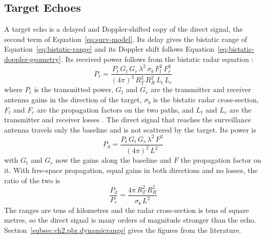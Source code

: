 \subsection{Target Echoes}
\label{subsec:th.signalmodel.targets}
\todo{}
A target echo is a delayed and Doppler-shifted copy of the direct signal, the second term of Equation~\ref{eq:surv-model}. Its delay gives the bistatic range of Equation~\ref{eq:bistatic-range} and its Doppler shift follows Equation~\ref{eq:bistatic-doppler-geometry}. Its received power follows from the bistatic radar equation \citep{kuschel2019}:
\begin{equation}
    P_r = \frac{P_t \, G_t \, G_r \, \lambda^2 \, \sigma_b \, F_t^2 \, F_r^2}
               {(4\pi)^3 \, R_T^2 \, R_R^2 \, L_t \, L_r}
    \label{eq:bistatic-radar}
\end{equation}
where $P_t$ is the transmitted power, $G_t$ and $G_r$ are the transmitter and receiver antenna gains in the direction of the target, $\sigma_b$ is the bistatic radar cross-section, $F_t$ and $F_r$ are the propagation factors on the two paths, and $L_t$ and $L_r$ are the transmitter and receiver losses .
The direct signal that reaches the surveillance antenna travels only the baseline and is not scattered by the target. Its power is \citep{kuschel2019}
\begin{equation}
    P_d = \frac{P_t \, G_t \, G_r \, \lambda^2 \, F^2}{(4\pi)^2 \, L^2}
    \label{eq:direct-power}
\end{equation}
with $G_t$ and $G_r$ now the gains along the baseline and $F$ the propagation factor on it. With free-space propagation, equal gains in both directions and no losses, the ratio of the two is
\begin{equation}
    \frac{P_d}{P_r} = \frac{4\pi \, R_T^2 \, R_R^2}{\sigma_b \, L^2}
    \label{eq:direct-to-echo}
\end{equation}
The ranges are tens of kilometres and the radar cross-section is tens of square metres, so the direct signal is many orders of magnitude stronger than the echo. Section~\ref{subsec:ch2.pbr.dynamicrange} gives the figures from the literature.

